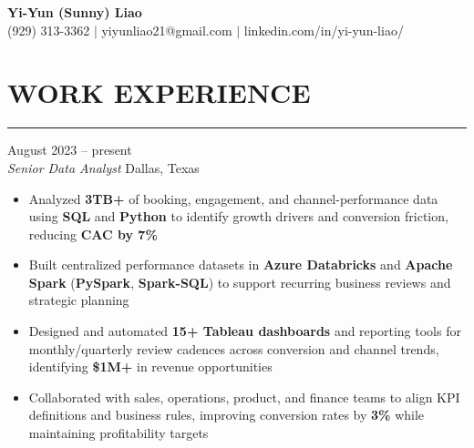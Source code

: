 \documentclass[11pt,letterpaper]{article}
\begin{document}
\begin{center}
  {\Large\textbf{Yi-Yun (Sunny) Liao}}\\[-2pt]
  (929) 313-3362 $|$ yiyunliao21@gmail.com $|$ linkedin.com/in/yi-yun-liao/
\end{center}

\vspace{-6pt}  %
\section*{WORK EXPERIENCE}
\vspace{-8pt}\noindent\rule{\textwidth}{0.8pt}

\vspace{2pt}
 \hfill August 2023 -- present\\[-1pt]
\textit{Senior Data Analyst} \hfill Dallas, Texas
\begin{itemize}[leftmargin=1.5em, rightmargin=0pt, itemsep=-1pt, topsep=0pt, parsep=0pt]
  \item \justifying Analyzed \textbf{3TB+} of booking, engagement, and channel-performance data using \textbf{SQL} and \textbf{Python} to identify growth drivers and conversion friction, reducing \textbf{CAC by 7\%}
  \item \justifying Built centralized performance datasets in \textbf{Azure Databricks} and \textbf{Apache Spark} (\textbf{PySpark}, \textbf{Spark-SQL}) to support recurring business reviews and strategic planning
  \item \justifying Designed and automated \textbf{15+ Tableau dashboards} and reporting tools for monthly/quarterly review cadences across conversion and channel trends, identifying \textbf{\$1M+} in revenue opportunities
  \item \justifying Collaborated with sales, operations, product, and finance teams to align KPI definitions and business rules, improving conversion rates by \textbf{3\%} while maintaining profitability targets
\end{itemize}
\end{document}
